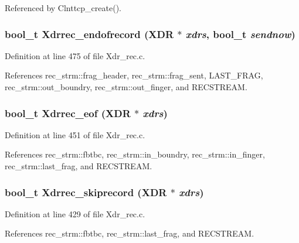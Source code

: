 Referenced by Clnttcp\_\-create().
\subsubsection{\setlength{\rightskip}{0pt plus 5cm}bool\_\-t Xdrrec\_\-endofrecord (XDR $\ast$ {\em xdrs}, bool\_\-t {\em sendnow})}\label{Xdr__rec_8c_a27}




Definition at line 475 of file Xdr\_\-rec.c.

References rec\_\-strm::frag\_\-header, rec\_\-strm::frag\_\-sent, LAST\_\-FRAG, rec\_\-strm::out\_\-boundry, rec\_\-strm::out\_\-finger, and RECSTREAM.
\subsubsection{\setlength{\rightskip}{0pt plus 5cm}bool\_\-t Xdrrec\_\-eof (XDR $\ast$ {\em xdrs})}\label{Xdr__rec_8c_a26}




Definition at line 451 of file Xdr\_\-rec.c.

References rec\_\-strm::fbtbc, rec\_\-strm::in\_\-boundry, rec\_\-strm::in\_\-finger, rec\_\-strm::last\_\-frag, and RECSTREAM.
\subsubsection{\setlength{\rightskip}{0pt plus 5cm}bool\_\-t Xdrrec\_\-skiprecord (XDR $\ast$ {\em xdrs})}\label{Xdr__rec_8c_a25}




Definition at line 429 of file Xdr\_\-rec.c.

References rec\_\-strm::fbtbc, rec\_\-strm::last\_\-frag, and RECSTREAM.